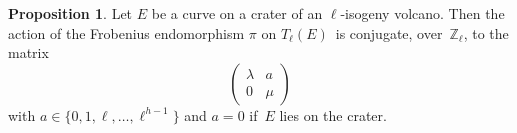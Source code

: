 \documentclass[10pt,a4paper]{beamer}
\theoremstyle{plain}
\theoremstyle{definition}
\theoremstyle{definition}
\theoremstyle{definition}
\newtheorem{prop}[thm]{Proposition}
\theoremstyle{definition}
\theoremstyle{remark}
\theoremstyle{remark}
\begin{document}
\begin{frame}

\begin{prop}\label{prop:matrice-frobenius}
Let $E$ be a curve on a crater of an $\ell$-isogeny volcano.
Then the action of the Frobenius endomorphism $\pi$ on $T_\ell(E)$~is conjugate, over~$\mathbb{Z}_\ell$,
to the matrix \[\left ( \begin{matrix}\lambda & a\\ 0 & \mu \end{matrix}\right ) \]  with $a \in \{ 0,1,\ell, \dots, \ell^{h-1}  \}$ and $a = 0$ if~$E$ lies on the crater.

\end{prop}

\begin{figure}
\begin{center}


\end{center}
\end{figure}
\end{frame}
\end{document}
